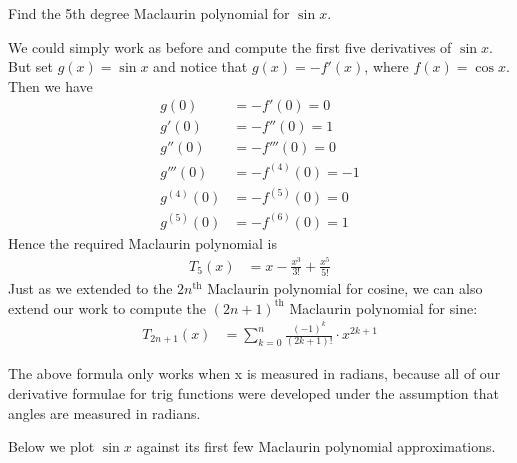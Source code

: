 \begin{eg}\label{eg expand sinx}
 Find the 5th degree Maclaurin polynomial for $\sin x$.

\soln We could simply work as before and compute the first five derivatives of $\sin x$.
But set $g(x) = \sin x$ and notice that $g(x) = - f'(x)$, where $f(x) =\cos x$. Then we
have
\begin{align*}
  g(0) &= -f'(0) = 0 \\
  g'(0) &= -f''(0) = 1\\
  g''(0) &= -f'''(0) = 0\\
  g'''(0) &= -f^{(4)}(0) = -1\\
  g^{(4)}(0) &= -f^{(5)}(0) = 0\\
  g^{(5)}(0) &= -f^{(6)}(0) = 1
\end{align*}
Hence the required Maclaurin polynomial is
\begin{align*}
  T_5(x) &= x - \frac{x^3}{3!} + \frac{x^5}{5!}
\end{align*}
Just as we extended to the $2n^\mathrm{th}$ Maclaurin polynomial for cosine, we can also
extend our work to compute the $(2n+1)^\mathrm{th}$ Maclaurin polynomial for sine:
\begin{align*}
  T_{2n+1}(x) &= \sum_{k=0}^n \frac{(-1)^k}{(2k+1)!} \cdot x^{2k+1}
\end{align*}
\begin{warning}
The above formula only works when x is measured in radians, because all of our
derivative formulae for trig functions were developed under the assumption that
angles are measured in radians.
\end{warning}


Below we plot $\sin x$ against its first few Maclaurin polynomial approximations.
\begin{efig}
\begin{center}


\end{center}
\end{efig}
\end{eg}
